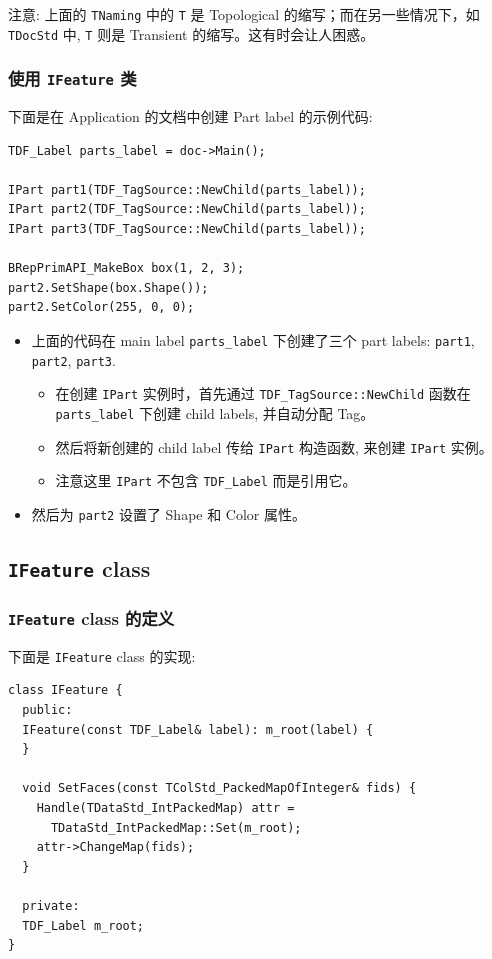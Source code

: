 \documentclass[11pt]{article}
\begin{document}
注意: 上面的 \texttt{TNaming} 中的 \texttt{T} 是 Topological 的缩写；而在另一些情况下，如 \texttt{TDocStd} 中, \texttt{T} 则是 Transient 的缩写。这有时会让人困惑。
\subsubsection{使用 \texttt{IFeature} 类}
\label{sec:orgb40365c}

下面是在 Application 的文档中创建 Part label 的示例代码:

\begin{verbatim}
TDF_Label parts_label = doc->Main();

IPart part1(TDF_TagSource::NewChild(parts_label));
IPart part2(TDF_TagSource::NewChild(parts_label));
IPart part3(TDF_TagSource::NewChild(parts_label));

BRepPrimAPI_MakeBox box(1, 2, 3);
part2.SetShape(box.Shape());
part2.SetColor(255, 0, 0);
\end{verbatim}

\begin{itemize}
\item 上面的代码在 main label \texttt{parts\_label} 下创建了三个 part labels: \texttt{part1}, \texttt{part2}, \texttt{part3}.
\begin{itemize}
\item 在创建 \texttt{IPart} 实例时，首先通过 \texttt{TDF\_TagSource::NewChild} 函数在 \texttt{parts\_label} 下创建 child labels, 并自动分配 Tag。
\item 然后将新创建的 child label 传给 \texttt{IPart} 构造函数, 来创建 \texttt{IPart} 实例。
\item 注意这里 \texttt{IPart} 不包含 \texttt{TDF\_Label} 而是引用它。
\end{itemize}
\item 然后为 \texttt{part2} 设置了 Shape 和 Color 属性。
\end{itemize}
\subsection{\texttt{IFeature} class}
\label{sec:org25a32ce}

\subsubsection{\texttt{IFeature} class 的定义}
\label{sec:org02f3d54}

下面是 \texttt{IFeature} class 的实现:

\begin{verbatim}
class IFeature {
  public:
  IFeature(const TDF_Label& label): m_root(label) {
  }

  void SetFaces(const TColStd_PackedMapOfInteger& fids) {
    Handle(TDataStd_IntPackedMap) attr =
      TDataStd_IntPackedMap::Set(m_root);
    attr->ChangeMap(fids);
  }

  private:
  TDF_Label m_root;
}
\end{verbatim}
\end{document}
